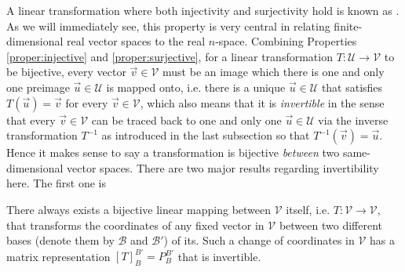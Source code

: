 A linear transformation where both injectivity and surjectivity hold is known as . As we will immediately see, this property is very central in relating finite-dimensional real vector spaces to the real $n$-space. Combining Properties \ref{proper:injective} and \ref{proper:surjective}, for a linear transformation $T: \mathcal{U} \to \mathcal{V}$ to be bijective, every vector $\vec{v} \in \mathcal{V}$ must be an image which there is one and only one preimage $\vec{u} \in \mathcal{U}$ is mapped onto, i.e. there is a unique $\vec{u} \in \mathcal{U}$ that satisfies $T(\vec{u}) = \vec{v}$ for every $\vec{v} \in \mathcal{V}$, which also means that it is \textit{invertible} in the sense that every $\vec{v} \in \mathcal{V}$ can be traced back to one and only one $\vec{u} \in \mathcal{U}$ via the inverse transformation $T^{-1}$ as introduced in the last subsection so that $T^{-1}(\vec{v}) = \vec{u}$. Hence it makes sense to say a transformation is bijective \textit{between} two same-dimensional vector spaces. There are two major results regarding invertibility here. The first one is
\begin{thm}
\label{thm:bijectivechincoord}
There always exists a bijective linear mapping between $\mathcal{V}$ itself, i.e. $T: \mathcal{V} \to \mathcal{V}$, that transforms the coordinates of any fixed vector in $\mathcal{V}$ between two different bases (denote them by $\mathcal{B}$ and $\mathcal{B}'$) of its. Such a change of coordinates in $\mathcal{V}$ has a matrix representation $[T]_B^{B'} = P_B^{B'}$ that is invertible.
\end{thm}
